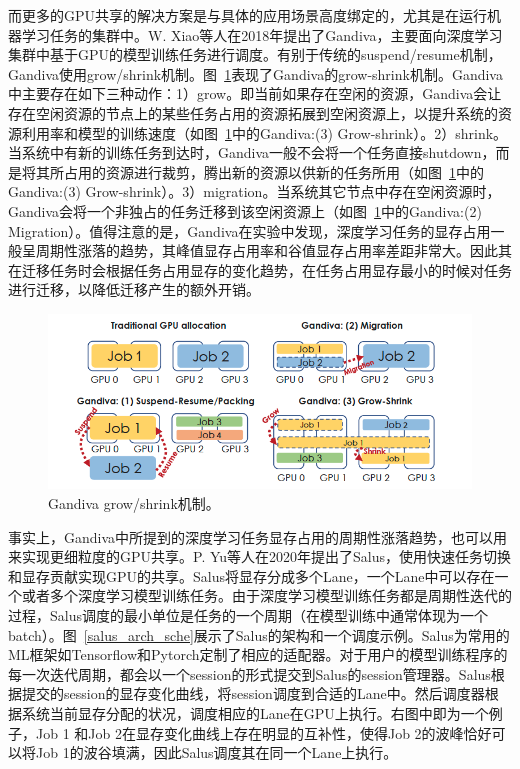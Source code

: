 而更多的GPU共享的解决方案是与具体的应用场景高度绑定的，尤其是在运行机器学习任务的集群中。W. Xiao等人在2018年提出了Gandiva\parencite{xiao2018gandiva}，主要面向深度学习集群中基于GPU的模型训练任务进行调度。有别于传统的suspend/resume机制，Gandiva使用grow/shrink机制。图~\ref{gandiva_grow_shrink}表现了Gandiva的grow-shrink机制。Gandiva中主要存在如下三种动作：1）grow。即当前如果存在空闲的资源，Gandiva会让存在空闲资源的节点上的某些任务占用的资源拓展到空闲资源上，以提升系统的资源利用率和模型的训练速度（如图~\ref{gandiva_grow_shrink}中的Gandiva:(3) Grow-shrink）。2）shrink。当系统中有新的训练任务到达时，Gandiva一般不会将一个任务直接shutdown，而是将其所占用的资源进行裁剪，腾出新的资源以供新的任务所用（如图~\ref{gandiva_grow_shrink}中的Gandiva:(3) Grow-shrink）。3）migration。当系统其它节点中存在空闲资源时，Gandiva会将一个非独占的任务迁移到该空闲资源上（如图~\ref{gandiva_grow_shrink}中的Gandiva:(2) Migration）。值得注意的是，Gandiva在实验中发现，深度学习任务的显存占用一般呈周期性涨落的趋势，其峰值显存占用率和谷值显存占用率差距非常大。因此其在迁移任务时会根据任务占用显存的变化趋势，在任务占用显存最小的时候对任务进行迁移，以降低迁移产生的额外开销。

\begin{figure}[h]
    \centerline{\includegraphics[width=\textwidth]{figures/gandiva-grow-shrink.png}}
    \caption{Gandiva grow/shrink机制。}
    \label{gandiva_grow_shrink}
\end{figure}

事实上，Gandiva中所提到的深度学习任务显存占用的周期性涨落趋势，也可以用来实现更细粒度的GPU共享。P. Yu等人在2020年提出了Salus\parencite{yu2020salus}，使用快速任务切换和显存贡献实现GPU的共享。Salus将显存分成多个Lane，一个Lane中可以存在一个或者多个深度学习模型训练任务。由于深度学习模型训练任务都是周期性迭代的过程，Salus调度的最小单位是任务的一个周期（在模型训练中通常体现为一个batch）。图~\ref{salus_arch_sche}展示了Salus的架构和一个调度示例。Salus为常用的ML框架如Tensorflow和Pytorch定制了相应的适配器。对于用户的模型训练程序的每一次迭代周期，都会以一个session的形式提交到Salus的session管理器。Salus根据提交的session的显存变化曲线，将session调度到合适的Lane中。然后调度器根据系统当前显存分配的状况，调度相应的Lane在GPU上执行。右图中即为一个例子，Job 1 和Job 2在显存变化曲线上存在明显的互补性，使得Job 2的波峰恰好可以将Job 1的波谷填满，因此Salus调度其在同一个Lane上执行。

